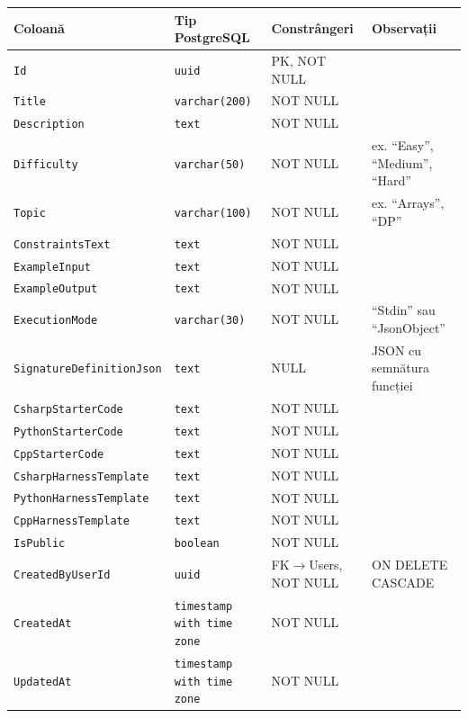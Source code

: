 \begin{tabular}{llll}
\hline
\textbf{Coloană} & \textbf{Tip PostgreSQL} & \textbf{Constrângeri} & \textbf{Observații} \\
\hline
\texttt{Id}                    & \texttt{uuid}           & PK, NOT NULL   & \\
\texttt{Title}                 & \texttt{varchar(200)}   & NOT NULL       & \\
\texttt{Description}           & \texttt{text}           & NOT NULL       & \\
\texttt{Difficulty}            & \texttt{varchar(50)}    & NOT NULL       & ex. ``Easy'', ``Medium'', ``Hard'' \\
\texttt{Topic}                 & \texttt{varchar(100)}   & NOT NULL       & ex. ``Arrays'', ``DP'' \\
\texttt{ConstraintsText}       & \texttt{text}           & NOT NULL       & \\
\texttt{ExampleInput}          & \texttt{text}           & NOT NULL       & \\
\texttt{ExampleOutput}         & \texttt{text}           & NOT NULL       & \\
\texttt{ExecutionMode}         & \texttt{varchar(30)}    & NOT NULL       & ``Stdin'' sau ``JsonObject'' \\
\texttt{SignatureDefinitionJson} & \texttt{text}         & NULL           & JSON cu semnătura funcției \\
\texttt{CsharpStarterCode}     & \texttt{text}           & NOT NULL       & \\
\texttt{PythonStarterCode}     & \texttt{text}           & NOT NULL       & \\
\texttt{CppStarterCode}        & \texttt{text}           & NOT NULL       & \\
\texttt{CsharpHarnessTemplate} & \texttt{text}           & NOT NULL       & \\
\texttt{PythonHarnessTemplate} & \texttt{text}           & NOT NULL       & \\
\texttt{CppHarnessTemplate}    & \texttt{text}           & NOT NULL       & \\
\texttt{IsPublic}              & \texttt{boolean}        & NOT NULL       & \\
\texttt{CreatedByUserId}       & \texttt{uuid}           & FK$\rightarrow$Users, NOT NULL & ON DELETE CASCADE \\
\texttt{CreatedAt}             & \texttt{timestamp with time zone} & NOT NULL & \\
\texttt{UpdatedAt}             & \texttt{timestamp with time zone} & NOT NULL & \\
\hline
\end{tabular}

